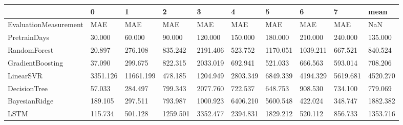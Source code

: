 \begin{tabular}{llllllllll}
\toprule
{} &        0 &         1 &        2 &        3 &        4 &        5 &        6 &        7 &     mean \\
\midrule
EvaluationMeasurement &      MAE &       MAE &      MAE &      MAE &      MAE &      MAE &      MAE &      MAE &      NaN \\
PretrainDays          &   30.000 &    60.000 &   90.000 &  120.000 &  150.000 &  180.000 &  210.000 &  240.000 &  135.000 \\
RandomForest          &   20.897 &   276.108 &  835.242 & 2191.406 &  523.752 & 1170.051 & 1039.211 &  667.521 &  840.524 \\
GradientBoosting      &   37.090 &   299.675 &  822.315 & 2033.019 &  692.941 &  521.033 &  666.563 &  593.014 &  708.206 \\
LinearSVR             & 3351.126 & 11661.199 &  478.185 & 1204.949 & 2803.349 & 6849.339 & 4194.329 & 5619.681 & 4520.270 \\
DecisionTree          &   57.033 &   284.497 &  799.343 & 2077.760 &  722.537 &  648.753 &  908.530 &  734.100 &  779.069 \\
BayesianRidge         &  189.105 &   297.511 &  793.987 & 1000.923 & 6406.210 & 5600.548 &  422.024 &  348.747 & 1882.382 \\
LSTM                  &  115.734 &   501.128 & 1259.501 & 3352.477 & 2394.831 & 1829.212 &  520.112 &  856.733 & 1353.716 \\
\bottomrule
\end{tabular}
